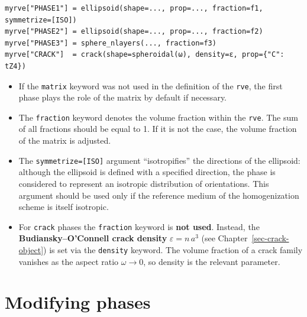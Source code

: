 \documentclass[
  a4paper,
  numbers=noendperiod,
  DIV=12]{scrreprt}
\providecommand{\tightlist}{%
  \setlength{\itemsep}{0pt}\setlength{\parskip}{0pt}}
\begin{document}
\begin{verbatim}
myrve["PHASE1"] = ellipsoid(shape=..., prop=..., fraction=f1, symmetrize=[ISO])
myrve["PHASE2"] = ellipsoid(shape=..., prop=..., fraction=f2)
myrve["PHASE3"] = sphere_nlayers(..., fraction=f3)
myrve["CRACK"]  = crack(shape=spheroidal(ω), density=ε, prop={"C": tZ4})
\end{verbatim}

\begin{tcolorbox}[enhanced jigsaw, arc=.35mm, bottomrule=.15mm, bottomtitle=1mm, breakable, colback=white, colbacktitle=quarto-callout-note-color!10!white, colframe=quarto-callout-note-color-frame, coltitle=black, left=2mm, leftrule=.75mm, opacityback=0, opacitybacktitle=0.6, rightrule=.15mm, title=\textcolor{quarto-callout-note-color}{\faInfo}\hspace{0.5em}{Notes}, titlerule=0mm, toprule=.15mm, toptitle=1mm]

\begin{itemize}
\tightlist
\item
  If the \texttt{matrix} keyword was not used in the definition of the
  \texttt{rve}, the first phase plays the role of the matrix by default
  if necessary.
\item
  The \texttt{fraction} keyword denotes the volume fraction within the
  \texttt{rve}. The sum of all fractions should be equal to 1. If it is
  not the case, the volume fraction of the matrix is adjusted.
\item
  The \texttt{symmetrize={[}ISO{]}} argument ``isotropifies'' the
  directions of the ellipsoid: although the ellipsoid is defined with a
  specified direction, the phase is considered to represent an isotropic
  distribution of orientations. This argument should be used only if the
  reference medium of the homogenization scheme is itself isotropic.
\item
  For \texttt{crack} phases the \texttt{fraction} keyword is \textbf{not
  used}. Instead, the \textbf{Budiansky--O'Connell crack density}
  \(\varepsilon = n\,a^3\) (see Chapter~\ref{sec-crack-object}) is set
  via the \texttt{density} keyword. The volume fraction of a crack
  family vanishes as the aspect ratio \(\omega \to 0\), so density is
  the relevant parameter.
\end{itemize}

\end{tcolorbox}

\section{Modifying phases}\label{modifying-phases}
\end{document}
